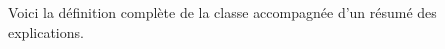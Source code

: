 \documentclass[11pt,class=report,crop=false]{standalone}
\begin{document}
\begin{cours}


Voici la définition complète de la classe  accompagnée d'un résumé des explications.


%
%
%
%
%
%        
%
%
%

\end{cours}
\end{document}
